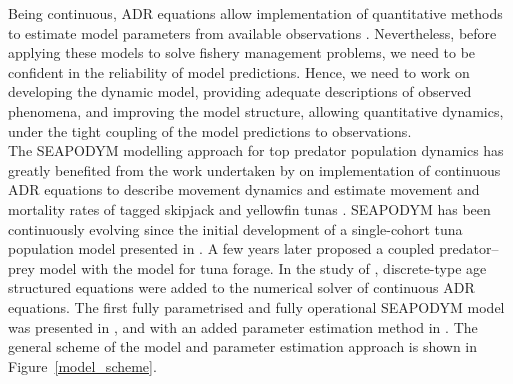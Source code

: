 Being continuous, ADR equations allow implementation of quantitative methods to estimate model parameters from available observations \citep{Sibert, Senina08}. Nevertheless, before applying these models to solve fishery management problems, we need to be confident in the reliability of model predictions. Hence, we need to work on developing the dynamic model, providing adequate descriptions of observed phenomena, and improving the model structure, allowing quantitative dynamics, under the tight coupling of the model predictions to observations. \\

The SEAPODYM modelling approach for top predator population dynamics has greatly benefited from the work undertaken by \citet{Sibert} on implementation of continuous ADR equations to describe movement dynamics and estimate movement and mortality rates of tagged skipjack and yellowfin tunas \citep*[see also][]{Sibert-Fournier}. SEAPODYM has been continuously evolving since the initial development of a single-cohort tuna population model presented in \citet{Bertignac}. A few years later \citet{Lehodey2001} proposed a coupled predator--prey model with the model for tuna forage. In the study of \citet{Lehodey2003}, discrete-type age structured equations were added to the numerical solver of continuous ADR equations. The first fully parametrised and fully operational SEAPODYM model was presented in \citet{Lehodey2008}, and with an added parameter estimation method in \citet{Senina08}. The general scheme of the model and parameter estimation approach is shown in Figure~\ref{model_scheme}. \\

